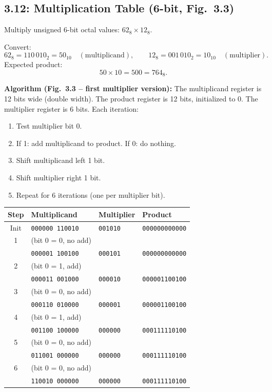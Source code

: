 \subsection*{3.12: Multiplication Table (6-bit, Fig.~3.3)}
\hypertarget{sol-3.12}{}

Multiply unsigned 6-bit octal values: $62_8 \times 12_8$.

Convert:
\[
  62_8 = 110\,010_2 = 50_{10} \quad(\text{multiplicand}), \qquad
  12_8 = 001\,010_2 = 10_{10} \quad(\text{multiplier}).
\]
Expected product:
\[
  50 \times 10 = 500 = 764_8.
\]

\medskip\noindent\textbf{Algorithm (Fig.~3.3 -- first multiplier version):}
The multiplicand register is 12 bits wide (double width). The product register
is 12 bits, initialized to 0. The multiplier register is 6 bits. Each iteration:

\begin{enumerate}
  \item Test multiplier bit 0.
  \item If 1: add multiplicand to product. If 0: do nothing.
  \item Shift multiplicand left 1 bit.
  \item Shift multiplier right 1 bit.
  \item Repeat for 6 iterations (one per multiplier bit).
\end{enumerate}

\begin{center}
\begin{tabular}{clll}
\toprule
\textbf{Step} & \textbf{Multiplicand} & \textbf{Multiplier} & \textbf{Product} \\
\midrule
Init & \texttt{000000\,110010} & \texttt{001010} & \texttt{000000000000} \\
1 & (bit 0 = 0, no add) & & \\
  & \texttt{000001\,100100} & \texttt{000101} & \texttt{000000000000} \\
2 & (bit 0 = 1, add) & & \\
  & \texttt{000011\,001000} & \texttt{000010} & \texttt{000001100100} \\
3 & (bit 0 = 0, no add) & & \\
  & \texttt{000110\,010000} & \texttt{000001} & \texttt{000001100100} \\
4 & (bit 0 = 1, add) & & \\
  & \texttt{001100\,100000} & \texttt{000000} & \texttt{000111110100} \\
5 & (bit 0 = 0, no add) & & \\
  & \texttt{011001\,000000} & \texttt{000000} & \texttt{000111110100} \\
6 & (bit 0 = 0, no add) & & \\
  & \texttt{110010\,000000} & \texttt{000000} & \texttt{000111110100} \\
\bottomrule
\end{tabular}
\end{center}

